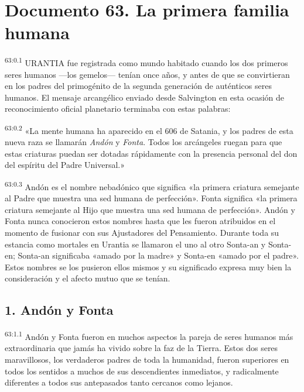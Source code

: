 \chapter{Documento 63. La primera familia humana}
\par
\textsuperscript{63:0.1} URANTIA fue registrada como mundo habitado cuando los dos primeros seres humanos ---los gemelos--- tenían once años, y antes de que se convirtieran en los padres del primogénito de la segunda generación de auténticos seres humanos. El mensaje arcangélico enviado desde Salvington en esta ocasión de reconocimiento oficial planetario terminaba con estas palabras:

\par
\textsuperscript{63:0.2} «La mente humana ha aparecido en el 606 de Satania, y los padres de esta nueva raza se llamarán \textit{Andón} y \textit{Fonta}. Todos los arcángeles ruegan para que estas criaturas puedan ser dotadas rápidamente con la presencia personal del don del espíritu del Padre Universal.»

\par
\textsuperscript{63:0.3} Andón es el nombre nebadónico que significa «la primera criatura semejante al Padre que muestra una sed humana de perfección». Fonta significa «la primera criatura semejante al Hijo que muestra una sed humana de perfección». Andón y Fonta nunca conocieron estos nombres hasta que les fueron atribuidos en el momento de fusionar con sus Ajustadores del Pensamiento. Durante toda su estancia como mortales en Urantia se llamaron el uno al otro Sonta-an y Sonta-en; Sonta-an significaba «amado por la madre» y Sonta-en «amado por el padre». Estos nombres se los pusieron ellos mismos y su significado expresa muy bien la consideración y el afecto mutuo que se tenían.

\section*{1. Andón y Fonta}
\par
\textsuperscript{63:1.1} Andón y Fonta fueron en muchos aspectos la pareja de seres humanos más extraordinaria que jamás ha vivido sobre la faz de la Tierra. Estos dos seres maravillosos, los verdaderos padres de toda la humanidad, fueron superiores en todos los sentidos a muchos de sus descendientes inmediatos, y radicalmente diferentes a todos sus antepasados tanto cercanos como lejanos.

